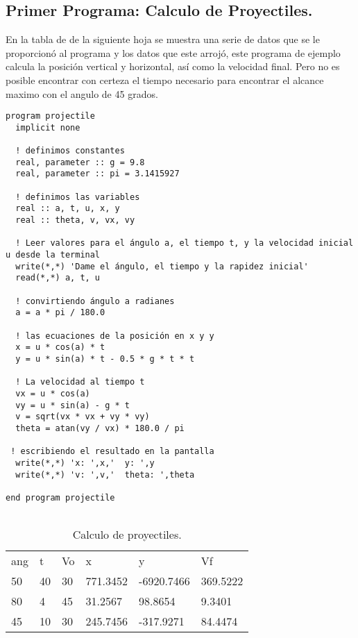 \documentclass{article}
\begin{document}
\subsection{Primer Programa: Calculo de Proyectiles.}
En la tabla de de la siguiente hoja se muestra una serie de datos que se le proporcionó al programa y los datos que este arrojó, este programa de ejemplo calcula la posición vertical y horizontal, así como la velocidad final. Pero no es posible encontrar con certeza el tiempo necesario para encontrar el alcance maximo con el angulo de 45 grados.
\begin{verbatim}
program projectile
  implicit none

  ! definimos constantes
  real, parameter :: g = 9.8
  real, parameter :: pi = 3.1415927

  ! definimos las variables
  real :: a, t, u, x, y
  real :: theta, v, vx, vy

  ! Leer valores para el ángulo a, el tiempo t, y la velocidad inicial u desde la terminal
  write(*,*) 'Dame el ángulo, el tiempo y la rapidez inicial'
  read(*,*) a, t, u

  ! convirtiendo ángulo a radianes
  a = a * pi / 180.0
  
  ! las ecuaciones de la posición en x y y
  x = u * cos(a) * t
  y = u * sin(a) * t - 0.5 * g * t * t

  ! La velocidad al tiempo t
  vx = u * cos(a)
  vy = u * sin(a) - g * t
  v = sqrt(vx * vx + vy * vy)
  theta = atan(vy / vx) * 180.0 / pi
 
 ! escribiendo el resultado en la pantalla
  write(*,*) 'x: ',x,'  y: ',y
  write(*,*) 'v: ',v,'  theta: ',theta

end program projectile


\end{verbatim}
\begin{table}[]
\centering
\caption{Calculo de proyectiles.}
\label{my-label}
\begin{tabular}{llllll}
ang  & t  & Vo & x        & y          & Vf       \\
50 & 40 & 30 & 771.3452 & -6920.7466 & 369.5222 \\
80 & 4  & 45 & 31.2567  & 98.8654    & 9.3401   \\
45 & 10 & 30 & 245.7456 & -317.9271  & 84.4474 
\end{tabular}
\end{table}
\end{document}
